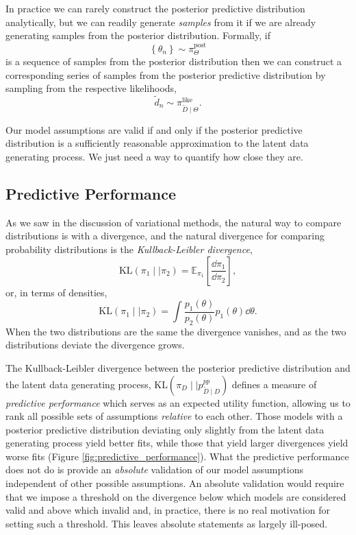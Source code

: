 In practice we can rarely construct the posterior predictive distribution 
analytically, but we can readily generate \emph{samples} from it if we 
are already generating samples from the posterior distribution.  Formally, 
if
%
\begin{equation*}
\left\{ \theta_{n} \right\} \sim \! \pi^{\mathrm{post}}_{\Theta}
\end{equation*}
%
is a sequence of samples from the posterior distribution then
we can construct a corresponding series of samples from the 
posterior predictive distribution by sampling from the respective 
likelihoods,
%
\begin{equation*}
\tilde{d}_{n} \sim \! \pi_{\widetilde{D} \mid \Theta}^{\mathrm{like}}.
\end{equation*}

Our model assumptions are valid if and only if the posterior
predictive distribution is a sufficiently reasonable approximation 
to the latent data generating process.  We just need a way to 
quantify how close they are.

\subsection{Predictive Performance}

As we saw in the discussion of variational methods, the
natural way to compare distributions is with a divergence,
and the natural divergence for comparing probability
distributions is the \emph{Kullback-Leibler divergence}, 
%
\begin{equation*}
\mathrm{KL} \! \left( \pi_{1} \mid\mid \pi_{2} \right)
=
\mathbb{E}_{\pi_{1}} \! \left[ \frac{ \dd \pi_{1} }{ \dd \pi_{2} } \right],
\end{equation*}
%
or, in terms of densities,
%
\begin{equation*}
\mathrm{KL} \! \left( \pi_{1} \mid\mid \pi_{2} \right)
= \int \frac{ p_{1} \! \left( \theta \right) }{ p_{2} \! \left( \theta \right) }
p_{1} \! \left( \theta \right) \dd \theta.
\end{equation*}
%
When the two distributions are the same the divergence 
vanishes, and as the two distributions deviate the divergence 
grows.

The Kullback-Leibler divergence between the posterior predictive
distribution and the latent data generating process, 
$\mathrm{KL} ( \pi_{D} \mid\mid p_{\widetilde{D} \mid D}^{pp} )$
defines a measure of \emph{predictive performance} which serves
as an expected utility function, allowing us to rank all possible 
sets of assumptions \emph{relative} to each other.  Those models
with a posterior predictive distribution deviating only slightly from
the latent data generating process yield better fits, while those that 
yield larger divergences yield worse fits 
(Figure \ref{fig:predictive_performance}).  What the predictive 
performance does not do is provide an \emph{absolute} validation 
of our model assumptions independent of other possible assumptions.  
An absolute validation would require that we impose a threshold on the 
divergence below which models are considered valid and above which 
invalid and, in practice, there is no real motivation for setting such a 
threshold.  This leaves absolute statements as largely ill-posed.

